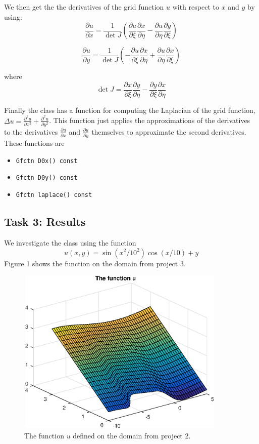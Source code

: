 \documentclass[a4paper,10pt]{article}
\begin{document}
We then get the the derivatives of the grid function $u$ with respect to $x$ and $y$ by using:
$$\frac{\partial u}{\partial x} = \frac{1}{\det J} \left(\frac{\partial u}{\partial \xi} \frac{\partial x}{\partial \eta} - \frac{\partial u}{\partial \eta} \frac{\partial y}{\partial \xi}  \right)$$

$$\frac{\partial u}{\partial y} = \frac{1}{\det J} \left(-\frac{\partial u}{\partial \xi} \frac{\partial x}{\partial \eta} + \frac{\partial u}{\partial \eta} \frac{\partial x}{\partial \xi}  \right)$$
 
where 
$$\det J = \frac{\partial x}{\partial \xi} \frac{\partial y}{\partial \eta} - \frac{\partial y}{\partial \xi} \frac{\partial x}{\partial \eta}   $$

Finally the class has a function for computing the Laplacian of the grid function, 
$\Delta u = \tfrac{\partial^2 u}{\partial x^2} + \tfrac{\partial^2 u}{\partial y^2}$. This function just applies the approximations of the derivatives to the derivatives $\tfrac{\partial u}{\partial x}$ and $\tfrac{\partial u}{\partial y}$ themselves to approximate the second derivatives. 
These functions are
\begin{itemize}
  \item
    \texttt{Gfctn D0x() const}
  \item
    \texttt{Gfctn D0y() const}
  \item
    \texttt{Gfctn laplace() const}
\end{itemize}
    




\subsection*{Task 3: Results}
We investigate the class using the function
\begin{equation*}
  u(x,y) = \sin (x^2/10^2) \cos (x/10) + y
\end{equation*}
Figure 1 shows the function on the domain from project 3.
\begin{figure}[ht!]
  \centering
  \includegraphics[width = 10cm, height = 8cm]{ufctn}
  \begin{minipage}[t]{100mm}
    \caption{
      The function $u$ defined on the domain from project 2.
    }\label{FIG_jjj}
  \end{minipage}
\end{figure}
\end{document}
